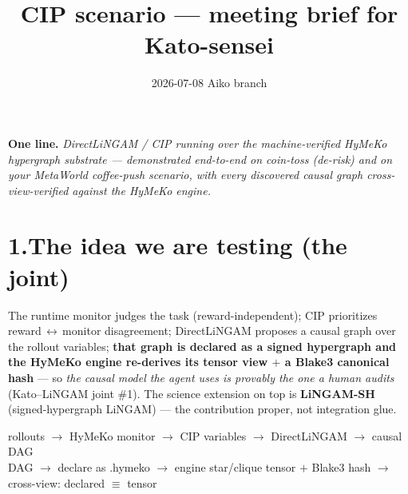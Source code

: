 \documentclass[11pt]{article}
\title{\vspace{-1.5em}\textbf{CIP scenario --- meeting brief for Kato-sensei}}
\author{}
\date{2026-07-08 \quad Aiko \quad branch \code{hymeko-neuro-migration}}
\newcommand{\code}[1]{\texttt{\detokenize{#1}}}
\renewcommand{\to}{\ensuremath{\rightarrow}}
\begin{document}
\maketitle
\vspace{-2.5em}

\noindent\textbf{One line.} \emph{DirectLiNGAM / CIP running over the machine-verified HyMeKo hypergraph
substrate --- demonstrated end-to-end on coin-toss (de-risk) and on your MetaWorld coffee-push scenario, with
every discovered causal graph cross-view-verified against the HyMeKo engine.}

\section*{1.\quad The idea we are testing (the joint)}
The runtime monitor judges the task (reward-independent); CIP prioritizes reward\,$\leftrightarrow$\,monitor
disagreement; DirectLiNGAM proposes a causal graph over the rollout variables; \textbf{that graph is declared as a
\code{.hymeko} signed hypergraph and the HyMeKo engine re-derives its tensor view $+$ a Blake3 canonical hash} ---
so \emph{the causal model the agent uses is provably the one a human audits} (Kato--LiNGAM joint \#1). The science
extension on top is \textbf{LiNGAM-SH} (signed-hypergraph LiNGAM) --- the contribution proper, not integration glue.

\begin{center}\small\ttfamily
rollouts $\to$ HyMeKo monitor $\to$ CIP variables $\to$ DirectLiNGAM $\to$ causal DAG\\
DAG $\to$ declare as .hymeko $\to$ engine star/clique tensor $+$ Blake3 hash $\to$ cross-view: declared $\equiv$ tensor
\end{center}
\end{document}
